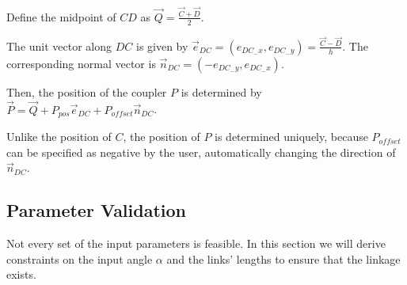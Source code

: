 \documentclass{article}
\begin{document}
\begin{itemize}
 	Define the midpoint of $CD$ as $\overrightarrow{Q} = \frac{\overrightarrow{C} + \overrightarrow{D}}{2}$.
 	
 	The unit vector along $DC$ is given by $\overrightarrow{e}_{DC} = (e_{DC_-x}, e_{DC_-y}) = \frac{\overrightarrow{C} - \overrightarrow{D}}{h}$. The corresponding normal vector is $\overrightarrow{n}_{DC} = (-e_{DC_-y}, e_{DC_-x})$.
 	
 	Then, the position of the coupler $P$ is determined by $\overrightarrow{P} = \overrightarrow{Q} + P_{pos} \overrightarrow{e}_{DC} + P_{offset} \overrightarrow{n}_{DC}$.
 	
 	Unlike the position of $C$, the position of $P$ is determined uniquely, because $P_{offset}$ can be specified as negative by the user, automatically changing the direction of $\overrightarrow{n}_{DC}$.
 \end{itemize}

 \subsection{Parameter Validation}
 
 Not every set of the input parameters is feasible. In this section we will derive constraints on the input angle $\alpha$ and the links' lengths to ensure that the linkage exists.
 
\end{document}
